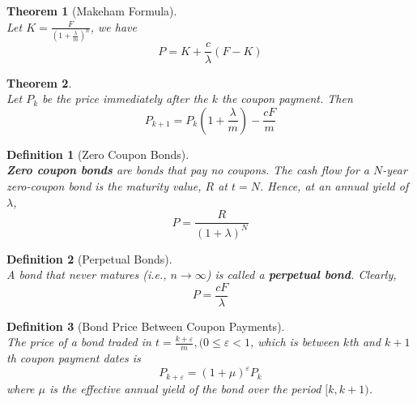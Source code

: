 \documentclass[12pt]{article}
\newtheorem{definition}{Definition}[section]
\newtheorem{theorem}{Theorem}[section]
\theoremstyle{definition}
\begin{document}
\begin{theorem}[Makeham Formula]
\hfill\\\normalfont Let $K=\frac{F}{\left(1+\frac{\lambda}{m}\right)^n}$, we have
\[
P=K+\frac{c}{\lambda}(F-K)
\]
\end{theorem}
\begin{theorem}
\hfill\\\normalfont
Let $P_k$ be the price immediately after the $k$ the coupon payment. Then
\[
P_{k+1}=P_{k}\left(1+\frac{\lambda}{m}\right)-\frac{cF}{m}
\]
\end{theorem}
\begin{definition}[Zero Coupon Bonds]
\hfill\\\normalfont \textbf{Zero coupon bonds} are bonds that pay no coupons. The cash flow for a $N$-year zero-coupon bond is the maturity value, $R$ at $t=N$. Hence, at an annual yield of $\lambda$,
\[
P=\frac{R}{(1+\lambda)^N}
\]
\end{definition}
\begin{definition}[Perpetual Bonds]
\hfill\\\normalfont A bond that never matures (i.e., $n\to \infty$) is called a \textbf{perpetual bond}. Clearly,
\[
P=\frac{cF}{\lambda}
\]
\end{definition}
\begin{definition}[Bond Price Between Coupon Payments]
\hfill\\\normalfont The price of a bond traded in $t=\frac{k+\varepsilon}{m}, (0\leq \varepsilon < 1$, which is between $k$th and $k+1$th coupon payment dates is
\[
P_{k+\varepsilon} = (1+\mu)^\varepsilon P_k
\]
where $\mu$ is the effective annual yield of the bond over the period $[k,k+1)$.
\end{definition}
\end{document}
